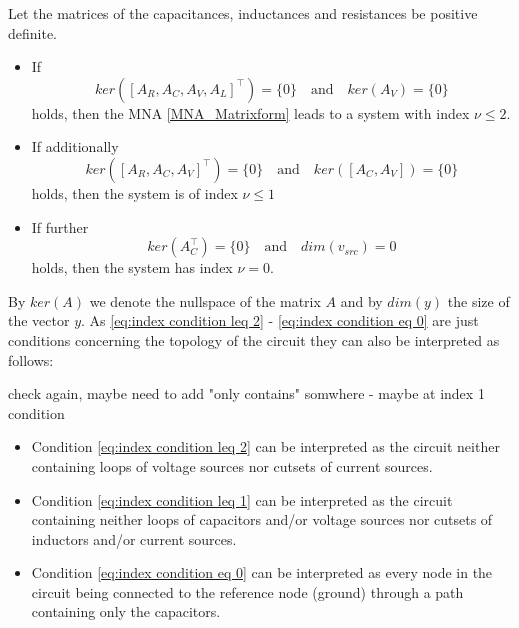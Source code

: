 \begin{theorem}
	Let the matrices of the capacitances, inductances and resistances be positive definite.
	\begin{itemize}
		\item If
		\begin{equation}
			\label{eq:index condition leq 2}
			ker([A_R, A_C, A_V, A_L]^\top) = \{0\} \quad \text{and} \quad ker(A_V) = \{0\}
		\end{equation}
		holds, then the MNA \eqref{MNA_Matrixform} leads to a system with index $\nu \leq 2$.
		
		\item If additionally
		\begin{equation}
			\label{eq:index condition leq 1}
			ker([A_R, A_C, A_V]^\top) = \{0\} \quad \text{and} \quad ker([A_C, A_V]) = \{0\}
		\end{equation}
		holds, then the system is of index $\nu \leq 1$
		
		\item If further
		\begin{equation}
			\label{eq:index condition eq 0}
			ker(A_C^\top) = \{0\} \quad \text{and} \quad dim(v_{src}) = 0
		\end{equation}
		holds, then the system has index $\nu = 0$.
	\end{itemize}
\end{theorem}

By $ker(A)$ we denote the nullspace of the matrix $A$ and by $dim(y)$ the size of the vector $y$. As \eqref{eq:index condition leq 2} - \eqref{eq:index condition eq 0} are just conditions concerning the topology of the circuit they can also be interpreted as follows:

check again, maybe need to add "only contains" somwhere - maybe at index 1 condition

\begin{itemize}
	\item Condition \eqref{eq:index condition leq 2} can be interpreted as the circuit neither containing loops of voltage sources nor cutsets of current sources.
	\item Condition \eqref{eq:index condition leq 1} can be interpreted as the circuit containing neither loops of capacitors and/or voltage sources nor cutsets of inductors and/or current sources.
	\item Condition \eqref{eq:index condition eq 0} can be interpreted as every node in the circuit being connected to the reference node (ground) through a path containing only the capacitors.
\end{itemize}

